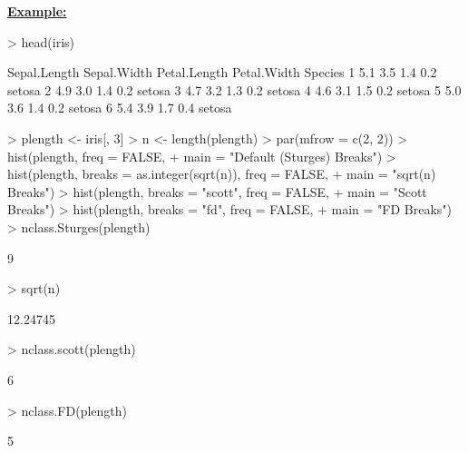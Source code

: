\documentclass[12pt,letterpaper,final]{article}
\begin{document}
\underline{\bf Example:}
%
\begin{Schunk}
\begin{Sinput}
> head(iris)
\end{Sinput}
\begin{Soutput}
  Sepal.Length Sepal.Width Petal.Length Petal.Width Species
1          5.1         3.5          1.4         0.2  setosa
2          4.9         3.0          1.4         0.2  setosa
3          4.7         3.2          1.3         0.2  setosa
4          4.6         3.1          1.5         0.2  setosa
5          5.0         3.6          1.4         0.2  setosa
6          5.4         3.9          1.7         0.4  setosa
\end{Soutput}
\begin{Sinput}
> plength <- iris[, 3]
> n <- length(plength)
> par(mfrow = c(2, 2))
> hist(plength, freq = FALSE,
+      main = "Default (Sturges) Breaks")
> hist(plength, breaks = as.integer(sqrt(n)), freq = FALSE,
+      main = "sqrt(n) Breaks")
> hist(plength, breaks = "scott", freq = FALSE,
+      main = "Scott Breaks")
> hist(plength, breaks = "fd", freq = FALSE,
+      main = "FD Breaks")
> nclass.Sturges(plength)
\end{Sinput}
\begin{Soutput}
[1] 9
\end{Soutput}
\begin{Sinput}
> sqrt(n)
\end{Sinput}
\begin{Soutput}
[1] 12.24745
\end{Soutput}
\begin{Sinput}
> nclass.scott(plength)
\end{Sinput}
\begin{Soutput}
[1] 6
\end{Soutput}
\begin{Sinput}
> nclass.FD(plength)
\end{Sinput}
\begin{Soutput}
[1] 5
\end{Soutput}
\end{Schunk}
\end{document}
